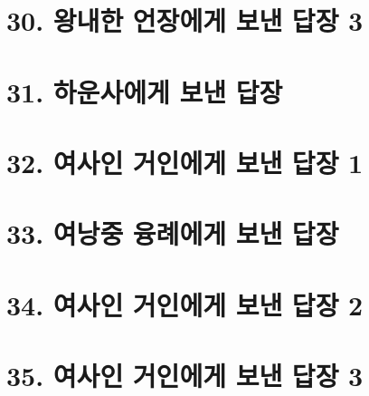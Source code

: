 \documentclass[12pt, a4paper, oneside]{book}
\let\stdsection\section
\renewcommand\section{\newpage\stdsection}
\begin{document}
%
	\section{30. 왕내한 언장에게 보낸 답장 3 }

%
	\section{31. 하운사에게 보낸 답장 }

%
	\section{32. 여사인 거인에게 보낸 답장 1}

%
	\section{33. 여낭중 융례에게 보낸 답장 }

%
 	\section{34. 여사인 거인에게 보낸 답장 2 }

%
 	\section{35. 여사인 거인에게 보낸 답장 3 }

%
\end{document}
